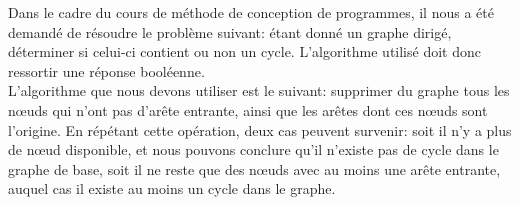Dans le cadre du cours de méthode de conception de programmes, il nous a été demandé de résoudre le problème suivant: étant donné un graphe dirigé, déterminer si celui-ci contient ou non un cycle. L'algorithme utilisé doit donc ressortir une réponse booléenne.\\

L'algorithme que nous devons utiliser est le suivant: supprimer du graphe tous les nœuds qui n'ont pas d'arête entrante, ainsi que les arêtes dont ces nœuds sont l'origine. En répétant cette opération, deux cas peuvent survenir: soit il n'y a plus de nœud disponible, et nous pouvons conclure qu'il n'existe pas de cycle dans le graphe de base, soit il ne reste que des nœuds avec au moins une arête entrante, auquel cas il existe au moins un cycle dans le graphe.

